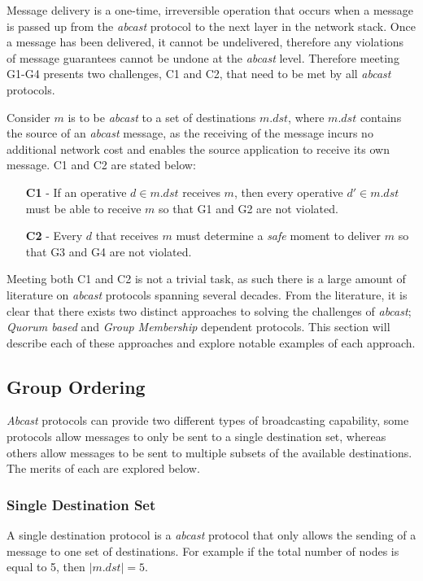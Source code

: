 Message delivery is a one-time, irreversible operation that occurs when a message is passed up from the \emph{abcast} protocol to the next layer in the network stack. Once a message has been delivered, it cannot be undelivered, therefore any violations of message guarantees cannot be undone at the \emph{abcast} level.  Therefore meeting G1-G4 presents two challenges, C1 and C2, that need to be met by all \emph{abcast} protocols.

Consider $m$ is to be \emph{abcast} to a set of destinations $m.dst$, where $m.dst$ contains the source of an \emph{abcast} message, as the receiving of the message incurs no additional network cost and enables the source application to receive its own message.  C1 and C2 are stated below:
\begin{itemize}
    \item[\textbf{C1}] - If an operative $d \in m.dst$ receives $m$, then every operative
     $d' \in m.dst$ must be able to receive $m$ so that G1 and G2 are not violated.
    \item[\textbf{C2}] - Every $d$ that receives $m$ must determine a \emph{safe} moment
to deliver $m$ so that G3 and G4 are not violated.
\end{itemize}

Meeting both C1 and C2 is not a trivial task, as such there is a large amount of literature\cite{Defago:2004:TOB:1041680.1041682} on \emph{abcast} protocols spanning several decades.  From the literature, it is clear that there exists two distinct approaches to solving the challenges of \emph{abcast}; \emph{Quorum based} and \emph{Group Membership} dependent protocols.  This section will describe each of these approaches and explore notable examples of each approach.  
	
    \subsection{Group Ordering}
    \emph{Abcast} protocols can provide two different types of broadcasting capability, some protocols allow messages to only be sent to a single destination set, whereas others allow messages to be sent to multiple subsets of the available destinations.  The merits of each are explored below.   
    
        \subsubsection{Single Destination Set}\label{ssec:single_destination_set}
        A single destination protocol is a \emph{abcast} protocol that only allows the sending of a message to one set of destinations.  For example if the total number of nodes is equal to 5, then $\left\vert{m.dst}\right\vert = 5$.
        
